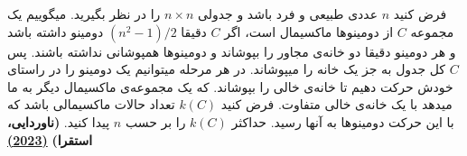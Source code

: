 فرض کنید $n$ عددی طبیعی و فرد باشد و جدولی $n \times n$ را در نظر بگیرید.
میگوییم یک مجموعه‌ $C$ از دومینوها ماکسیمال است، اگر $C$ دقیقا $(n^2 - 1)/2$ دومینو داشته باشد و 
هر دومینو دقیقا دو خانه‌ی مجاور را بپوشاند و دومینوها همپوشانی نداشته باشند. 
پس $C$ کل جدول به جز یک خانه را میپوشاند. 
در هر مرحله میتوانیم یک دومینو را در راستای خودش حرکت دهیم تا خانه‌ی خالی را بپوشاند. 
که یک مجموعه‌ی ماکسیمال دیگر به ما میدهد با یک خانه‌ی خالی متفاوت.
فرض کنید $k(C)$ تعداد حالات ماکسیمالی باشد که با این حرکت دومینوها به آنها رسید. 
حداکثر $k(C)$ را بر حسب $n$ پیدا کنید.
\textbf{(ناوردایی، استقرا)}
\href{https://artofproblemsolving.com/community/c5h3038308p27349423}{\textbf{(2023)}}